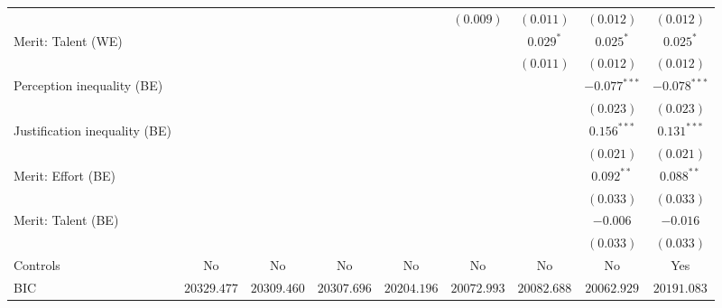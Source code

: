 \documentclass[
  12pt,
]{article}
\begin{document}
\begin{table}
{\begin{center}
{\begin{tabular}{l c c c c c c c c}
                                     &                &                &                &                & $(0.009)$      & $(0.011)$      & $(0.012)$      & $(0.012)$      \\
Merit: Talent (WE)                   &                &                &                &                &                & $0.029^{*}$    & $0.025^{*}$    & $0.025^{*}$    \\
                                     &                &                &                &                &                & $(0.011)$      & $(0.012)$      & $(0.012)$      \\
Perception inequality (BE)           &                &                &                &                &                &                & $-0.077^{***}$ & $-0.078^{***}$ \\
                                     &                &                &                &                &                &                & $(0.023)$      & $(0.023)$      \\
Justification inequality (BE)        &                &                &                &                &                &                & $0.156^{***}$  & $0.131^{***}$  \\
                                     &                &                &                &                &                &                & $(0.021)$      & $(0.021)$      \\
Merit: Effort (BE)                   &                &                &                &                &                &                & $0.092^{**}$   & $0.088^{**}$   \\
                                     &                &                &                &                &                &                & $(0.033)$      & $(0.033)$      \\
Merit: Talent (BE)                   &                &                &                &                &                &                & $-0.006$       & $-0.016$       \\
                                     &                &                &                &                &                &                & $(0.033)$      & $(0.033)$      \\
\hline
Controls                             & No             & No             & No             & No             & No             & No             & No             & Yes            \\
BIC                                  & $20329.477$    & $20309.460$    & $20307.696$    & $20204.196$    & $20072.993$    & $20082.688$    & $20062.929$    & $20191.083$    \\

\end{tabular}}
\end{center}}
\end{table}
\end{document}

